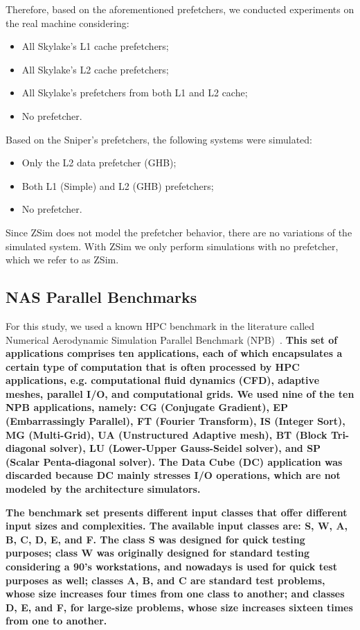 \documentclass[AMA,final,STIX1COL]{WileyNJD-v2}
\newcommand\new[1]{{\color{red}\textbf{#1}}}
\begin{document}
Therefore, based on the aforementioned prefetchers, we conducted experiments on the real machine considering: 
\begin{itemize}
    \item All Skylake's L1 cache prefetchers;
    \item All Skylake's L2 cache prefetchers;
    \item All Skylake's prefetchers from both L1 and L2 cache;
    \item No prefetcher.
\end{itemize}

Based on the Sniper's prefetchers, the following systems were simulated:
\begin{itemize}
    \item Only the L2 data prefetcher (GHB);
    \item Both L1 (Simple) and L2 (GHB) prefetchers;
    \item No prefetcher.
\end{itemize}

Since ZSim does not model the prefetcher behavior, there are no variations of the simulated system. With ZSim we only perform simulations with no prefetcher, which we refer to as ZSim.



\subsection{NAS Parallel Benchmarks}
\label{subsec:nas}


For this study, we used a known HPC benchmark in the literature called Numerical Aerodynamic Simulation Parallel Benchmark (NPB)~\cite{jin1999openmp}. 
\new{This set of applications comprises ten applications, each of which encapsulates a certain type of computation that is often processed by HPC applications, e.g. computational fluid dynamics (CFD), adaptive meshes, parallel I/O, and computational grids.
We used nine of the ten NPB applications, namely: CG (Conjugate Gradient), EP (Embarrassingly Parallel), FT (Fourier Transform), IS (Integer Sort), MG (Multi-Grid), UA (Unstructured Adaptive mesh), BT (Block Tri-diagonal solver), LU (Lower-Upper Gauss-Seidel solver), and SP (Scalar Penta-diagonal solver).
The Data Cube (DC) application was discarded because DC mainly stresses I/O operations, which are not modeled by the architecture simulators.}



\new{The benchmark set presents different input classes that offer different input sizes and complexities.
The available input classes are: S, W, A, B, C, D, E, and F.
The class S was designed for quick testing purposes; class W was originally designed for standard testing considering a 90's workstations, and nowadays is used for quick test purposes as well; classes A, B, and C are standard test problems, whose size increases four times from one class to another; and classes D, E, and F, for large-size problems, whose size increases sixteen times from one to another.}
\end{document}
